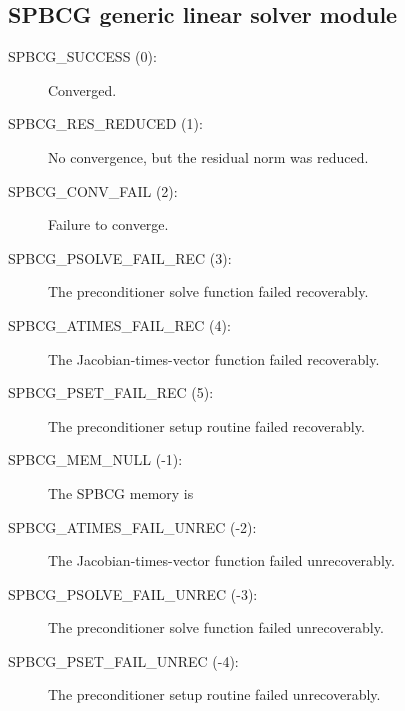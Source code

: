 \documentclass[letterpaper,10pt,english]{sphinxmanual}
\begin{document}
\subsection{SPBCG generic linear solver module}
\label{Constants:spbcg-generic-linear-solver-module}\begin{description}
\item[{SPBCG\_SUCCESS  (0):}] \leavevmode
Converged.

\item[{SPBCG\_RES\_REDUCED  (1):}] \leavevmode
No convergence, but the residual norm
was reduced.

\item[{SPBCG\_CONV\_FAIL  (2):}] \leavevmode
Failure to converge.

\item[{SPBCG\_PSOLVE\_FAIL\_REC  (3):}] \leavevmode
The preconditioner solve function
failed recoverably.

\item[{SPBCG\_ATIMES\_FAIL\_REC  (4):}] \leavevmode
The Jacobian-times-vector function
failed recoverably.

\item[{SPBCG\_PSET\_FAIL\_REC  (5):}] \leavevmode
The preconditioner setup routine
failed recoverably.

\item[{SPBCG\_MEM\_NULL  (-1):}] \leavevmode
The SPBCG memory is 

\item[{SPBCG\_ATIMES\_FAIL\_UNREC  (-2):}] \leavevmode
The Jacobian-times-vector function
failed unrecoverably.

\item[{SPBCG\_PSOLVE\_FAIL\_UNREC  (-3):}] \leavevmode
The preconditioner solve function
failed unrecoverably.

\item[{SPBCG\_PSET\_FAIL\_UNREC  (-4):}] \leavevmode
The preconditioner setup routine
failed unrecoverably.

\end{description}
\end{document}
